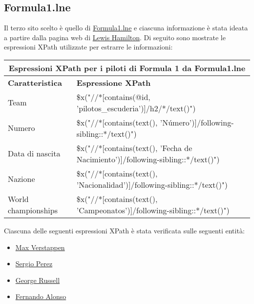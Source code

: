 \documentclass[12pt, letterpaper]{article}
\begin{document}
\subsection{Formula1.lne}
Il terzo sito scelto è quello di \href{https://formula1.lne.esl}{Formula1.lne} e ciascuna informazione è stata ideata a partire dalla pagina web di \href{https://formula1.lne.es/pilotos-f1/lewis-hamilton.html}{Lewis Hamilton}. Di seguito sono mostrate le espressioni XPath utilizzate per estrarre le informazioni: 
\begin{center}
\begin{table}[!h]
\begin{tabular}{ |p{3cm}|p{9cm}| }
\hline
\multicolumn{2}{|c|}{\textbf{Espressioni XPath per i piloti di Formula 1 da Formula1.lne}} \\
\hline
 \hline
\textbf{Caratteristica} & \textbf{Espressione XPath} \\[1ex]
 \hline\hline
Team & \$x("//*[contains(@id, 'pilotos\_escuderia')]/h2/*/text()") \\
Numero & \$x("//*[contains(text(), 'N\'{u}mero')]/following-sibling::*/text()")  \\
Data di nascita & \$x("//*[contains(text(), 'Fecha de Nacimiento')]/following-sibling::*/text()") \\
Nazione & \$x("//*[contains(text(), 'Nacionalidad')]/following-sibling::*/text()") \\
World championships & \$x("//*[contains(text(), 'Campeonatos')]/following-sibling::*/text()") \\
 \hline
\end{tabular}
\end{table}
\end{center}

Ciascuna delle seguenti espressioni XPath è stata verificata sulle seguenti entità:
\begin{itemize}
    \item \href{https://formula1.lne.es/pilotos-f1/max-verstappen.html}{Max Verstappen}
    \item \href{https://formula1.lne.es/pilotos-f1/sergio-perez.html}{Sergio Perez}
    \item \href{https://formula1.lne.es/pilotos-f1/george-russell.html}{George Russell}
    \item \href{https://formula1.lne.es/pilotos-f1/fernando-alonso.html}{Fernando Alonso}
\end{itemize}
\end{document}
